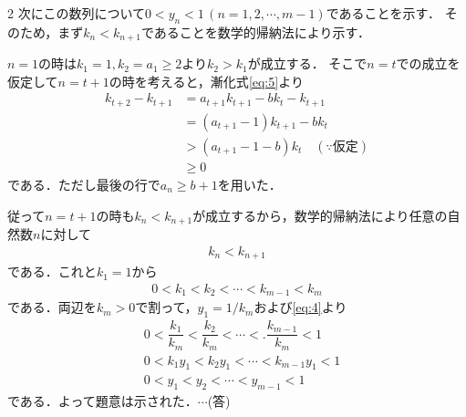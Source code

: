 \documentclass[../../main.tex]{subfiles}
\begin{document}
\begin{multicols}{2}
  次にこの数列について$0<y_n<1\, (n=1,2,\cdots, m-1)$であることを示す．
  そのため，まず$k_{n}<k_{n+1}$であることを数学的帰納法により示す．

  $n=1$の時は$k_1=1,k_2=a_1\ge 2$より$k_2>k_1$が成立する．
  そこで$n=t$での成立を仮定して$n=t+1$の時を考えると，漸化式\cref{eq:5}より
  \begin{align}
    k_{t+2} - k_{t+1}
    & = a_{t+1} k_{t+1} - bk_t - k_{t+1}                           \\
    & = \left(a_{t+1}-1\right) k_{t+1} - bk_t                      \\
    & >  \left(a_{t+1}-1 - b\right) k_t \quad (\because \text{仮定}) \\
    & \ge 0
  \end{align}
  である．ただし最後の行で$a_n\ge b+1$を用いた．

  従って$n=t+1$の時も$k_{n}<k_{n+1}$が成立するから，数学的帰納法により任意の自然数$n$に対して
  \begin{align}
    k_{n} < k_{n+1}
  \end{align}
  である．これと$k_1=1$から
  \begin{align}
    0< k_1 < k_2 < \cdots < k_{m-1} < k_m
  \end{align}
  である．両辺を$k_m>0$で割って，$y_1=1/k_m$および\cref{eq:4}より
  \begin{align}
    & 0< \dfrac{k_1}{k_m} < \dfrac{k_2}{k_m} < \cdots <.  \dfrac{k_{m-1}}{k_m} < 1 \\
    & 0< k_1y_1 < k_2y_1 < \cdots < k_{m-1}y_1 <  1                             \\
    & 0 < y_1 < y_2 < \cdots < y_{m-1} < 1
  \end{align}
  である．よって題意は示された．$\cdots$(答)


\end{multicols}
\end{document}
